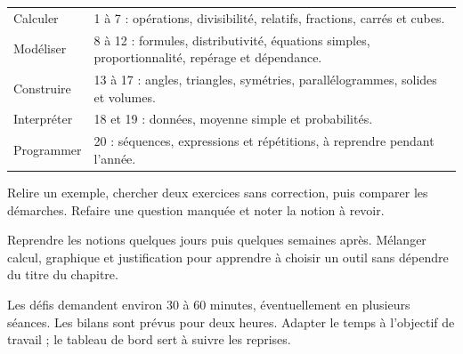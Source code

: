 \clearpage\thispagestyle{otFront}\label{parcours}\fontsize{11}{15}\selectfont

\begin{tabularx}{\linewidth}{@{}lY@{}}\toprule
Calculer & 1 à 7 : opérations, divisibilité, relatifs, fractions, carrés et cubes.\\[3mm]
Modéliser & 8 à 12 : formules, distributivité, équations simples, proportionnalité, repérage et dépendance.\\[3mm]
Construire & 13 à 17 : angles, triangles, symétries, parallélogrammes, solides et volumes.\\[3mm]
Interpréter & 18 et 19 : données, moyenne simple et probabilités.\\[3mm]
Programmer & 20 : séquences, expressions et répétitions, à reprendre pendant l’année.\\\bottomrule
\end{tabularx}
\begin{savoirfaire}Relire un exemple, chercher deux
exercices sans correction, puis comparer les démarches. Refaire une
question manquée et noter la notion à revoir.\end{savoirfaire}
\begin{savoirfaire}Reprendre les notions quelques jours
puis quelques semaines après. Mélanger calcul, graphique et justification
pour apprendre à choisir un outil sans dépendre du titre du chapitre.\end{savoirfaire}
Les défis demandent environ 30 à 60 minutes, éventuellement en plusieurs
séances. Les bilans sont prévus pour deux heures. Adapter le temps à
l’objectif de travail ; le tableau de bord sert à suivre les reprises.

\clearpage
